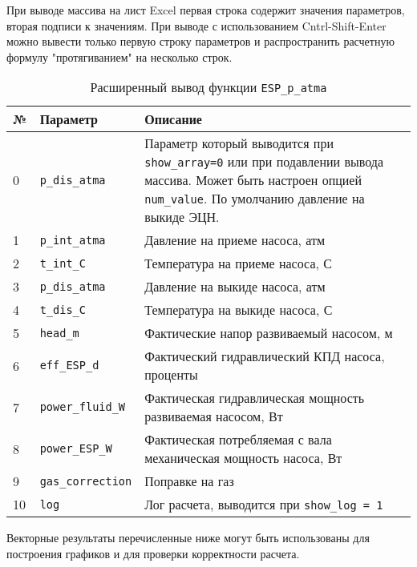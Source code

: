 При выводе массива на лист Excel первая строка содержит значения параметров, вторая подписи к значениям. При выводе с использованием Cntrl-Shift-Enter можно вывести только первую строку параметров и распространить расчетную формулу "протягиванием" на несколько строк.

\begin{table}[H]
	\caption{Расширенный вывод функции \texttt{ESP_p_atma} }
	\label{table:res_ESP_p_atma}
	\begin{tabular}{p{}p{}p{}}
		\hline
		№& Параметр & Описание  \\ \hline
		0 & \texttt{p_dis_atma} & Параметр который выводится при \texttt{show_array=0} или при подавлении вывода массива. Может быть настроен опцией  \texttt{num_value}. По умолчанию давление на выкиде ЭЦН. \\ \hline
		
		1 & \texttt{p_int_atma} & Давление на приеме насоса, атм    \\ \hline
		2 & \texttt{t_int_C} &   Температура на приеме насоса, С    \\ \hline
		3 & \texttt{p_dis_atma} & Давление на выкиде насоса, атм     \\ \hline
		4 & \texttt{t_dis_C} & Температура на выкиде насоса, С     \\ \hline
		5 & \texttt{head_m} & Фактические напор развиваемый насосом, м   \\ \hline
		6 & \texttt{eff_ESP_d} & Фактический гидравлический КПД насоса, проценты \\ \hline
		7 & \texttt{power_fluid_W} & Фактическая гидравлическая мощность развиваемая насосом, Вт \\ \hline
		8 & \texttt{power_ESP_W} & Фактическая потребляемая с вала механическая мощность насоса, Вт \\ \hline
		9 & \texttt{gas_correction} & Поправке на газ \\ \hline
		10 & \texttt{log} & Лог расчета, выводится при \texttt{show_log = 1}  \\ \hline
		
	\end{tabular}
\end{table}

Векторные результаты перечисленные ниже могут быть использованы для построения графиков и для проверки корректности расчета.

